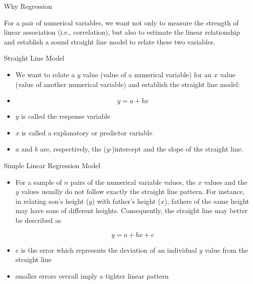 \documentclass[14pt]{beamer}\usepackage[]{graphicx}\usepackage[]{color}
\begin{document}
\begin{frame}[fragile]{Why Regression}

For a pair of numerical variables, we want not only to measure the  strength of linear association (i.e., correlation), but also to estimate the  linear relationship and establish a sound straight line model to relate  these two variables.

\end{frame}

\begin{frame}[fragile]{Straight Line Model}

\begin{itemize}
\item<1-> We want to relate a $y$ value (value of a numerical variable) for an $x$ value  (value of another numerical variable) and establish the straight line model:

\item<2->
\begin{equation*}
y = a + bx
\end{equation*}


\item<3-> $y$ is called the response variable
\item<4-> $x$ is called a explanatory or predictor variable
\item<5-> $a$ and $b$ are, respectively, the ($y$-)intercept and the slope of the straight line.
\end{itemize}
\end{frame}

\begin{frame}[fragile]{Simple Linear Regression Model}

\begin{itemize}
\item<1-> For a sample of $n$ pairs of the numerical variable values, the $x$ values  and the $y$ values usually do not follow exactly the straight line pattern.  For instance, in relating son's height ($y$) with father's height ($x$), fathers  of the same height may have sons of different heights. Consequently,  the straight line may better be described as

\vspace{-3mm}

\begin{equation*}
y = a + bx + e
\end{equation*}

\item<2-> $e$ is the error which represents the deviation of an individual $y$
value from the straight line
\item<3-> smaller errors overall imply a tighter linear pattern
\end{itemize}

\end{frame}
\end{document}
